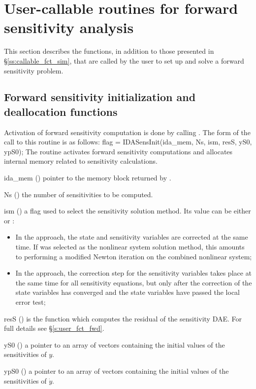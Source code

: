 \section{User-callable routines for forward sensitivity analysis}

This section describes the {\idas} functions, in addition to those presented
in \S\ref{ss:callable_fct_sim}, that are called by the user to set up and solve
a forward sensitivity problem.

\subsection{Forward sensitivity initialization and deallocation functions}
\label{ss:sensi_init}
Activation of forward sensitivity computation is done by calling
.
The form of the call to this routine is as follows:
{
  flag = IDASensInit(ida\_mem, Ns, ism, resS, yS0, ypS0);
}
{
  The routine  activates forward sensitivity computations and
  allocates internal memory related to sensitivity calculations.
}
{
  \begin{args}

  \item[ida\_mem] ()
    pointer to the {\idas} memory block returned by .
  \item[Ns] () 
    the number of sensitivities to be computed.
  \item[ism] ()
    a flag used to select the sensitivity solution method.  Its value can 
    be either  or :
    \begin{itemize}
    \item In the  approach, the state and sensitivity variables are
      corrected at the same time. If  was selected as the nonlinear system 
      solution method, this amounts to performing a modified Newton iteration on the
      combined nonlinear system;
    \item In the  approach, the correction step for the sensitivity
      variables takes place at the same time for all sensitivity equations, but only after 
      the correction of the state variables has converged and the state variables 
      have passed the local error test; 
    \end{itemize}
  \item[resS] ()
    is the {\CC} function which computes the residual of the sensitivity DAE. 
    For full details see \S\ref{s:user_fct_fwd}.
  \item[yS0] () 
    a pointer to an array of  vectors containing the initial 
    values of the sensitivities of $y$.
  \item[ypS0] () 
    a pointer to an array of  vectors containing the initial 
    values of the sensitivities of $\dot{y}$.
  \end{args}
}
